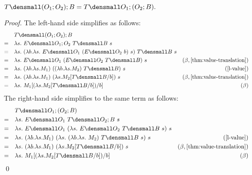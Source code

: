 \begin{lemma}
  \label{thm:templ-compose-assoc}

  $ T\den{(O_1;O_2);B} = T\den{O_1;(O_2;B)}.$
\end{lemma}
\begin{proof}
  The left-hand side simplifies as follows:
  \begin{align*}
    &\quad T\den{(O_1;O_2);B} \\
    =& \quad \lambda s.~ E\den{O_1;O_2} ~T\den{B} ~s \\
    =& \quad \lambda s.~ (\lambda b. \lambda s.~ E\den{O_1} ~(E\den{O_2} ~b) ~s) ~T\den{B} ~s \\
    =& \quad \lambda s.~ E\den{O_1} ~(E\den{O_2} ~T\den{B}) ~s & (\beta, \cref{thm:value-translation}) \\
    =& \quad \lambda s.~ (\lambda b.\lambda s. M_1) ~((\lambda b. \lambda s. M_2) ~T\den{B}) ~s & (\cref{l-value}) \\
    =& \quad \lambda s.~ (\lambda b.\lambda s. M_1) ~(\lambda s. M_2\subst{b}{T\den{B}}) ~s & (\beta, \cref{thm:value-translation}) \\
    =& \quad \lambda s.~ M_1\subst{b}{(\lambda s. M_2\subst{b}{T\den{B}})} & (\beta) \\
  \end{align*}
  The right-hand side simplifies to the same term as follows:
  \begin{align*}
    &\quad T\den{O_1;(O_2;B)} \\
    =& \quad \lambda s.~ E\den{O_1} ~T\den{O_2;B} ~s \\
    =& \quad \lambda s.~ E\den{O_1} ~(\lambda s. ~E\den{O_2} ~T\den{B} ~s) ~s \\
    =& \quad \lambda s.~ (\lambda b. \lambda s. M_1) ~(\lambda s. ~(\lambda b. \lambda s.~ M_2) ~T\den{B} ~s) ~s & (\cref{l-value}) \\
    =& \quad \lambda s.~ (\lambda b. \lambda s. M_1) ~(\lambda s. M_2\subst{b}{T\den{B}}) ~s & (\beta, \cref{thm:value-translation}) \\
    =& \quad \lambda s.~ M_1\subst{b}{(\lambda s. M_2\subst{b}{T\den{B}})} & (\beta) \\
  \end{align*}
  \qed
\end{proof}


